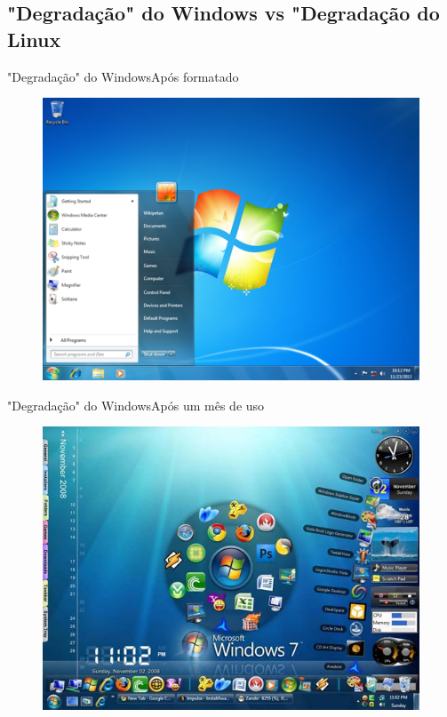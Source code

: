 \documentclass{beamer}
\begin{document}
\subsection{"Degradação" do Windows vs "Degradação do Linux}
\begin{frame}{"Degradação" do Windows}{Após formatado}
    \begin{figure}[h!]
        \centering
        \includegraphics[scale=0.5]{Windows_7.png}
    \end{figure}
\end{frame}

\begin{frame}{"Degradação" do Windows}{Após um mês de uso}
    \begin{figure}[h!]
        \centering
        \includegraphics[scale=0.4]{ruindows7.jpg}
    \end{figure}
\end{frame}
\end{document}
